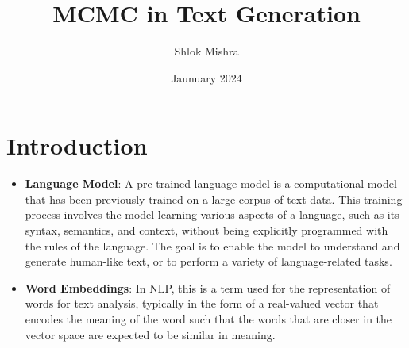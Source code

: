 \documentclass{article}
\title{MCMC in Text Generation}
\author{Shlok Mishra}
\date{Jaunuary 2024}
\begin{document}
\maketitle

%     

\section{Introduction}

\begin{itemize}
    \item \textbf{Language Model}: A pre-trained language model is a computational model that has been previously trained on a large corpus of text data. This training process involves the model learning various aspects of a language, such as its syntax, semantics, and context, without being explicitly programmed with the rules of the language. The goal is to enable the model to understand and generate human-like text, or to perform a variety of language-related tasks.

    \item \textbf{Word Embeddings}: In NLP, this is a term used for the representation of words for text analysis, typically in the form of a real-valued vector that encodes the meaning of the word such that the words that are closer in the vector space are expected to be similar in meaning.



\end{itemize}
\end{document}
